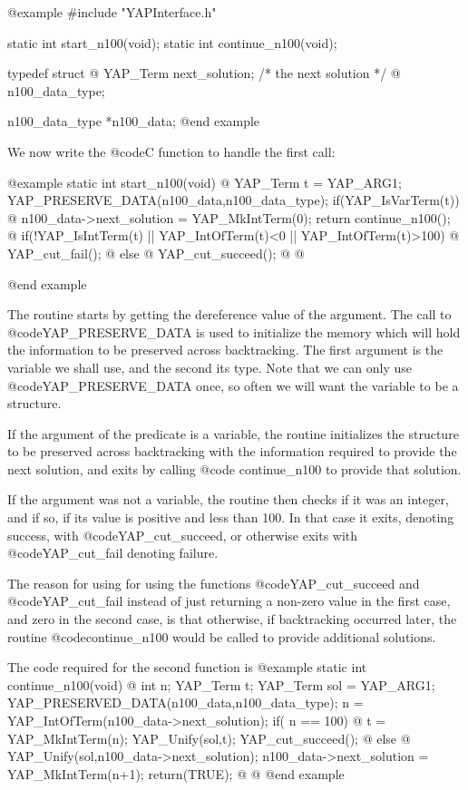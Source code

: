 {{{{{{{{{@example
#include "YAPInterface.h"

static int start_n100(void);
static int continue_n100(void);

typedef struct @{
    YAP_Term next_solution;  /* the next solution */
   @} n100_data_type;

n100_data_type *n100_data;
@end example

We now write the @code{C} function to handle the first call:

@example
static int start_n100(void)
@{
      YAP_Term t = YAP_ARG1;
      YAP_PRESERVE_DATA(n100_data,n100_data_type);
      if(YAP_IsVarTerm(t)) @{
          n100_data->next_solution = YAP_MkIntTerm(0);
          return continue_n100();
       @}
      if(!YAP_IsIntTerm(t) || YAP_IntOfTerm(t)<0 || YAP_IntOfTerm(t)>100) @{
          YAP_cut_fail();
      @} else @{
          YAP_cut_succeed();
      @}
@}

@end example

The routine starts by getting the dereference value of the argument.
The call to @code{YAP_PRESERVE_DATA} is used to initialize the memory which will
hold the information to be preserved across backtracking. The first
argument is the variable we shall use, and the second its type. Note
that we can only use @code{YAP_PRESERVE_DATA} once, so often we will
want the variable to be a structure.

If the argument of the predicate is a variable, the routine initializes the 
structure to be preserved across backtracking with the information
required to provide the next solution, and exits by calling @code{
continue_n100} to provide that solution.

If the argument was not a variable, the routine then checks if it was an
integer, and if so, if its value is positive and less than 100. In that
case it exits, denoting success, with @code{YAP_cut_succeed}, or
otherwise exits with @code{YAP_cut_fail} denoting failure.

The reason for using for using the functions @code{YAP_cut_succeed} and
@code{YAP_cut_fail} instead of just returning a non-zero value in the
first case, and zero in the second case, is that otherwise, if
backtracking occurred later, the routine @code{continue_n100} would be
called to provide additional solutions.

The code required for the second function is
@example
static int continue_n100(void)
@{
      int n;
      YAP_Term t;
      YAP_Term sol = YAP_ARG1;
      YAP_PRESERVED_DATA(n100_data,n100_data_type);
      n = YAP_IntOfTerm(n100_data->next_solution);
      if( n == 100) @{
           t = YAP_MkIntTerm(n);
           YAP_Unify(sol,t);
           YAP_cut_succeed();
        @}
       else @{
           YAP_Unify(sol,n100_data->next_solution);
           n100_data->next_solution = YAP_MkIntTerm(n+1);
           return(TRUE);
        @}
@}
@end example

}}}}}}}}}
